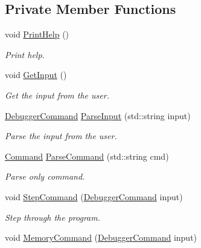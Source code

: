 \subsection*{Private Member Functions}
\begin{DoxyCompactItemize}
\item 
\mbox{\label{classDebugger_ae66b0dfadc7193b527b7043227d9305d}} 
void \mbox{\hyperlink{classDebugger_ae66b0dfadc7193b527b7043227d9305d}{Print\+Help}} ()
\begin{DoxyCompactList}\small\item\em Print help. \end{DoxyCompactList}\item 
\mbox{\label{classDebugger_aaa0e1715ca58184a633246d14f0a30a1}} 
void \mbox{\hyperlink{classDebugger_aaa0e1715ca58184a633246d14f0a30a1}{Get\+Input}} ()
\begin{DoxyCompactList}\small\item\em Get the input from the user. \end{DoxyCompactList}\item 
\mbox{\hyperlink{structDebuggerCommand}{Debugger\+Command}} \mbox{\hyperlink{classDebugger_a3e9ec9c48ced49c1b6ee3ca269b52511}{Parse\+Input}} (std\+::string input)
\begin{DoxyCompactList}\small\item\em Parse the input from the user. \end{DoxyCompactList}\item 
\mbox{\hyperlink{debugger_8hpp_a2afce0a47a93eee73a314d53e4890153}{Command}} \mbox{\hyperlink{classDebugger_a3b76c1eed577ef8e338073f8fc980d83}{Parse\+Command}} (std\+::string cmd)
\begin{DoxyCompactList}\small\item\em Parse only command. \end{DoxyCompactList}\item 
void \mbox{\hyperlink{classDebugger_a085572c1d390deeb33240dc36a4b9254}{Step\+Command}} (\mbox{\hyperlink{structDebuggerCommand}{Debugger\+Command}} input)
\begin{DoxyCompactList}\small\item\em Step through the program. \end{DoxyCompactList}\item 
void \mbox{\hyperlink{classDebugger_af8888a358dba262eaf7cc3f6d10b1acc}{Memory\+Command}} (\mbox{\hyperlink{structDebuggerCommand}{Debugger\+Command}} input)

\end{DoxyCompactItemize}
